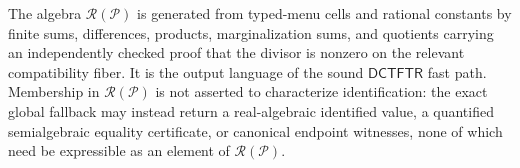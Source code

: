 The algebra \(\mathscr R(\mathcal P)\) is generated from typed-menu cells and rational constants by finite sums, differences, products, marginalization sums, and quotients carrying an independently checked proof that the divisor is nonzero on the relevant compatibility fiber.  It is the output language of the sound \(\mathsf{DCTFTR}\) fast path.  Membership in \(\mathscr R(\mathcal P)\) is not asserted to characterize identification: the exact global fallback may instead return a real-algebraic identified value, a quantified semialgebraic equality certificate, or canonical endpoint witnesses, none of which need be expressible as an element of \(\mathscr R(\mathcal P)\).